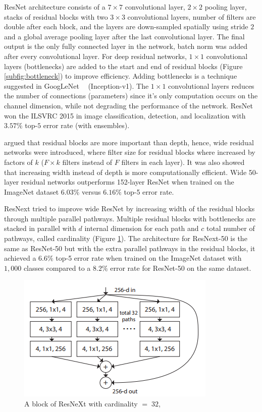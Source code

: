\documentclass[12pt]{report}
\numberwithin{equation}{section}
\begin{document}
ResNet architecture consists of a $7 \times 7$ convolutional layer, $2 \times 2$ pooling layer, stacks of residual blocks with two $3 \times 3$ convolutional layers, number of filters are double after each block, and the layers are down-sampled spatially using stride $2$ and a global average pooling layer after the last convolutional layer. The final output is the only fully connected layer in the network, batch norm was added after every convolutional layer. For deep residual networks, $1 \times 1$ convolutional layers (bottlenecks) are added to the start and end of residual blocks (Figure \ref{subfig:bottleneck}) to improve efficiency. Adding bottlenecks is a technique suggested in  GoogLeNet \textbf{~\cite{szegedy2015going}} (Inception-v1). The $1 \times 1$ convolutional layers reduces the number of connections (parameters) since it's only computation occurs on the channel dimension, while not degrading the performance of the network. ResNet won the ILSVRC 2015 in image classification, detection, and localization with $3.57\%$ top-$5$ error rate (with ensembles).

\textbf{\cite{zagoruyko2017wide}} argued that residual blocks are more important than depth, hence, wide residual networks were introduced, where filter size for residual blocks where increased by factors of $k$ ($F \times k$ filters instead of $F$ filters in each layer). It was also showed that increasing width instead of depth is more computationally efficient. Wide 50-layer residual networks outperforms 152-layer ResNet when trained on the ImageNet dataset $6.03\%$ versus $6.16\%$ top-5 error rate. 

ResNext \textbf{\cite{Xie}} tried to improve wide ResNet by increasing width of the residual blocks through multiple parallel pathways. Multiple residual blocks with bottlenecks are stacked in parallel with $d$ internal dimension for each path and $c$ total number of pathways, called cardinality (Figure \ref{fig:resnext}). The architecture for ResNext-50 is the same as ResNet-50 but with the extra parallel pathways in the residual blocks, it achieved a $6.6\%$ top-5 error rate when trained on the ImageNet dataset with $1,000$ classes compared to a $8.2\%$ error rate for ResNet-50 on the same dataset.
\begin{figure}[H]
\centering
\includegraphics[scale=1.1]{png/resnext.png}
\caption[A block of ResNeXt with cardinality = 32]{A block of ResNeXt with cardinality $= \;32$, \protect\textbf{\cite{Xie}}}	
\label{fig:resnext}
\end{figure} 
\end{document}
